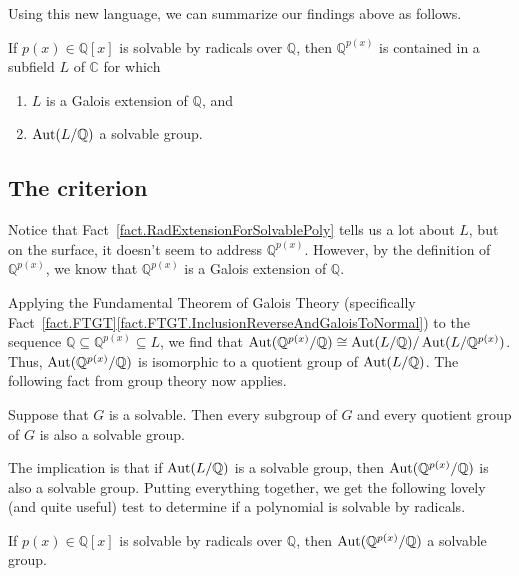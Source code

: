 Using this new language, we can summarize our findings above as follows. 

\begin{fact}\label{fact.RadExtensionForSolvablePoly}
If $p(x)\in \mathbb{Q}[x]$ is solvable by radicals over $\mathbb{Q}$, then $\mathbb{Q}^{p(x)}$ is contained in a subfield $L$ of $\mathbb{C}$ for which
\begin{enumerate}
\item $L$ is a Galois extension of $\mathbb{Q}$, and 
\item $\operatorname{Aut}(L/\mathbb{Q})$ a solvable group.
\end{enumerate} 
\end{fact}

\subsection{The criterion}

Notice that Fact~\ref{fact.RadExtensionForSolvablePoly} tells us a lot about $L$, but on the surface, it doesn't seem to address $\mathbb{Q}^{p(x)}$. However, by the definition of $\mathbb{Q}^{p(x)}$, we know that $\mathbb{Q}^{p(x)}$ is a Galois extension of $\mathbb{Q}$. 

Applying the Fundamental Theorem of Galois Theory (specifically Fact~\ref{fact.FTGT}\ref{fact.FTGT.InclusionReverseAndGaloisToNormal}) to the sequence $\mathbb{Q} \subseteq \mathbb{Q}^{p(x)} \subseteq L$, we find that $\operatorname{Aut}(\mathbb{Q}^{p(x)}/\mathbb{Q})\cong \operatorname{Aut}(L/\mathbb{Q})/ \operatorname{Aut}(L/\mathbb{Q}^{p(x)})$. Thus, $\operatorname{Aut}(\mathbb{Q}^{p(x)}/\mathbb{Q})$ is isomorphic to a quotient group of $\operatorname{Aut}(L/\mathbb{Q})$. The following fact from group theory now applies. 

\begin{fact}
Suppose that $G$ is a solvable. Then every subgroup of $G$ and every quotient group of $G$ is also a solvable group.
\end{fact}

The implication is that if $\operatorname{Aut}(L/\mathbb{Q})$ is a solvable group, then $\operatorname{Aut}(\mathbb{Q}^{p(x)}/\mathbb{Q})$ is also a solvable group. Putting everything together, we get the following lovely (and quite useful) test to determine if a polynomial is solvable by radicals. 

\begin{fact}\label{fact.SolvabilityCriterion}
If $p(x)\in \mathbb{Q}[x]$ is solvable by radicals over $\mathbb{Q}$, then $\operatorname{Aut}(\mathbb{Q}^{p(x)}/\mathbb{Q})$ a solvable group.
\end{fact}

